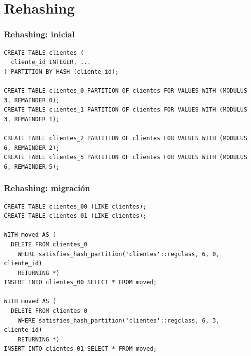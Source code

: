 \documentclass[ignorenonframetext,t]{beamer}
\begin{document}
\section{Rehashing}

\begin{frame}[fragile]
	\frametitle{Rehashing: inicial}

  \begin{lstlisting}
CREATE TABLE clientes (
  cliente_id INTEGER, ...
) PARTITION BY HASH (cliente_id);

CREATE TABLE clientes_0 PARTITION OF clientes FOR VALUES WITH (MODULUS 3, REMAINDER 0);
CREATE TABLE clientes_1 PARTITION OF clientes FOR VALUES WITH (MODULUS 3, REMAINDER 1);

CREATE TABLE clientes_2 PARTITION OF clientes FOR VALUES WITH (MODULUS 6, REMAINDER 2);
CREATE TABLE clientes_5 PARTITION OF clientes FOR VALUES WITH (MODULUS 6, REMAINDER 5);
  \end{lstlisting}
\end{frame}

\begin{frame}[fragile]
	\frametitle{Rehashing: migración}
	\scriptsize
	\begin{lstlisting}
CREATE TABLE clientes_00 (LIKE clientes);
CREATE TABLE clientes_01 (LIKE clientes);

WITH moved AS (
  DELETE FROM clientes_0
    WHERE satisfies_hash_partition('clientes'::regclass, 6, 0, cliente_id)
    RETURNING *)
INSERT INTO clientes_00 SELECT * FROM moved;

WITH moved AS (
  DELETE FROM clientes_0
    WHERE satisfies_hash_partition('clientes'::regclass, 6, 3, cliente_id)
    RETURNING *)
INSERT INTO clientes_01 SELECT * FROM moved;
	\end{lstlisting}
\end{frame}
\end{document}
